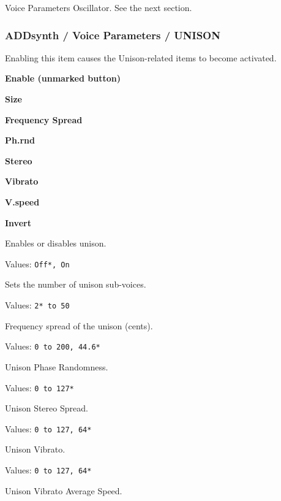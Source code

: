    Voice Parameters Oscillator.
   See the next section.

\subsubsection{ADDsynth / Voice Parameters / UNISON}
\label{subsubsec:addsynth_voice_parameters_unison}
   Enabling this item causes the Unison-related items to become
   activated.

   \begin{enumber}
      \item \textbf{Enable (unmarked button)}
      \item \textbf{Size}
      \item \textbf{Frequency Spread}
      \item \textbf{Ph.rnd}
      \item \textbf{Stereo}
      \item \textbf{Vibrato}
      \item \textbf{V.speed}
      \item \textbf{Invert}
   \end{enumber}

   \setcounter{ItemCounter}{0}      %

   Enables or disables unison.

   Values: \texttt{Off*, On}

   Sets the number of unison sub-voices.

   Values: \texttt{2* to 50}

   Frequency spread of the unison (cents).

   Values: \texttt{0 to 200, 44.6*}

   Unison Phase Randomness.

   Values: \texttt{0 to 127*}

   Unison Stereo Spread.

   Values: \texttt{0 to 127, 64*}

   Unison Vibrato.

   Values: \texttt{0 to 127, 64*}

   Unison Vibrato Average Speed.


